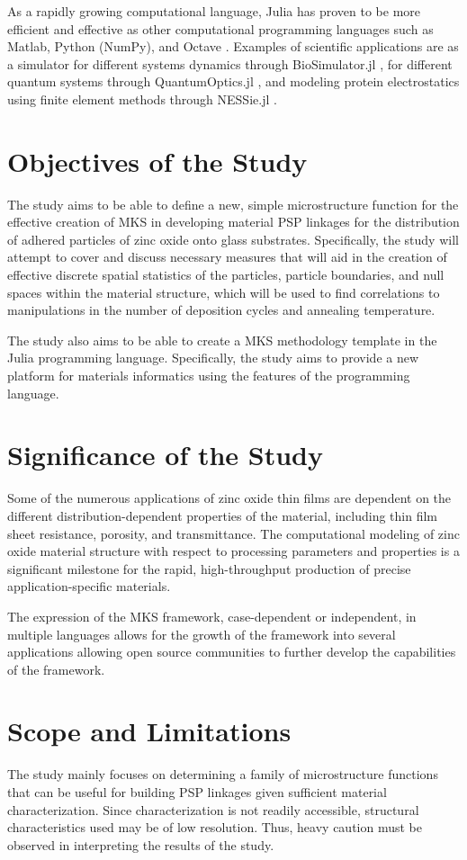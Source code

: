 As a rapidly growing computational language, Julia has proven to be more efficient and effective as other computational programming languages such as Matlab, Python (NumPy), and Octave \cite{julia15}. Examples of scientific applications are as a simulator for different systems dynamics through BioSimulator.jl \cite{biosim}, for different quantum systems through QuantumOptics.jl \cite{qoptics}, and modeling protein electrostatics using finite element methods through NESSie.jl \cite{nessie}.

\section{Objectives of the Study}
The study aims to be able to define a new, simple microstructure function for the effective creation of MKS in developing material PSP linkages for the distribution of adhered particles of zinc oxide onto glass substrates.
Specifically, the study will attempt to cover and discuss necessary measures that will aid in the creation of effective discrete spatial statistics of the particles, particle boundaries, and null spaces within the material structure, which will be used to find correlations to manipulations in the number of deposition cycles and annealing temperature.

The study also aims to be able to create a MKS methodology template in the Julia programming language.
Specifically, the study aims to provide a new platform for materials informatics using the features of the programming language.


\section{Significance of the Study}
Some of the numerous applications of zinc oxide thin films are dependent on the different distribution-dependent properties of the material, including thin film sheet resistance, porosity, and transmittance.
The computational modeling of zinc oxide material structure with respect to processing parameters and properties is a significant milestone for the rapid, high-throughput production of precise application-specific materials.

The expression of the MKS framework, case-dependent or independent, in multiple languages allows for the growth of the framework into several applications allowing open source communities to further develop the capabilities of the framework.

\section{Scope and Limitations}
The study mainly focuses on determining a family of microstructure functions that can be useful for building PSP linkages given sufficient material characterization.
Since characterization is not readily accessible, structural characteristics used may be of low resolution.
Thus, heavy caution must be observed in interpreting the results of the study.
